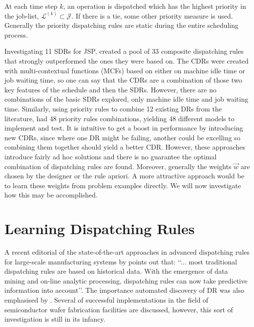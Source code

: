 \documentclass[smallextended]{svjour3}
\begin{document}
At each time step $k$, an operation is dispatched which has the highest 
priority in the job-list, $\mathcal{L}^{(k)}\subset\mathcal{J}$.  If there is a 
tie, some other priority measure is used. Generally the priority dispatching 
rules are static during the entire scheduling process.

Investigating 11 SDRs for JSP, \citet{Lu13} created a pool of 33 composite 
dispatching rules that strongly outperformed the ones they were based on. 
The CDRs were created with multi-contextual functions (MCFs) 
based on either on machine idle time or job waiting time, so one can say that 
the CDRs are a combination of those two key features of the schedule and then 
the SDRs. However, there are no combinations of the basic SDRs explored, only 
machine idle time and job waiting time.  
Similarly, using priority rules to combine 12 existing DRs from the literature, 
\citet{Yu13} had 48 priority rules combinations, yielding 48 different models 
to implement and test. 
It is intuitive to get a boost in performance by introducing new CDRs, since 
where one DR might be failing, another could be excelling so combining them 
together should yield a better CDR. However, these approaches introduce fairly 
ad hoc solutions and there is no guarantee the optimal combination of 
dispatching rules are found.
Moreover, generally the weights $\vec{w}$ are chosen by the designer or the 
rule apriori.  A more attractive approach would be to learn these weights from 
problem examples directly. We will now investigate how this may be accomplished.

\section{Learning Dispatching Rules}\label{ch:learningmodels}
A recent editorial of the state-of-the-art approaches in advanced dispatching 
rules for large-scale manufacturing systems by \citet{Chen13} points out that:
\lq\lq ... most traditional dispatching rules are based on historical data. 
With the emergence of data mining and on-line analytic processing, dispatching 
rules can now take predictive information into account\rq\rq. The importance 
automated discovery of DR was also emphasised by \cite{Monch13}. 
Several of successful implementations in the field of semiconductor wafer 
fabrication facilities are discussed, however, this sort of investigation is 
still in its infancy.
\end{document}
